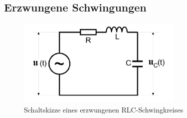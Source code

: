 \subsection{Erzwungene Schwingungen}


\begin{figure}[H]
  \centering
  \includegraphics{content/ErzwungenerSchwingkreis.png}
  \caption{Schaltskizze eines erzwungenen RLC-Schwingkreises}
  \label{fig:esk}
\end{figure}



